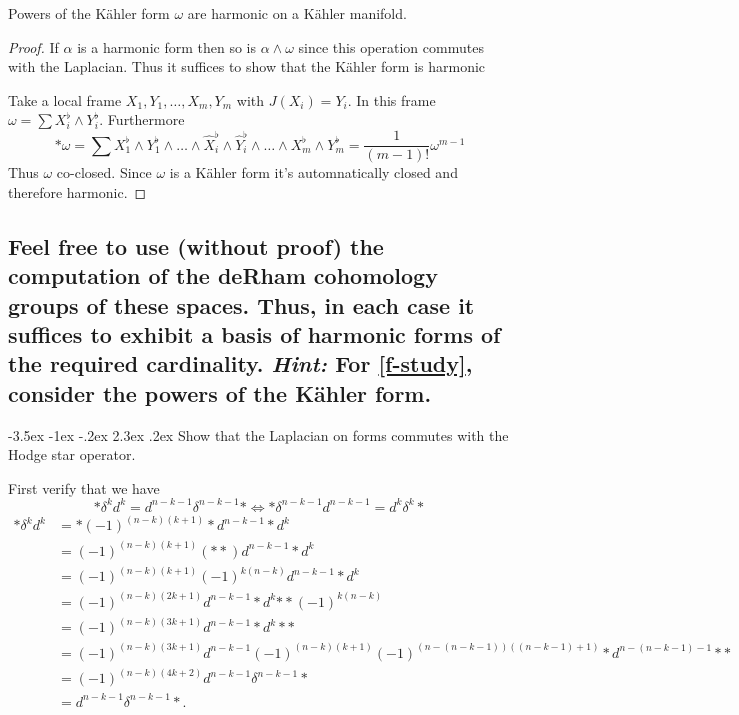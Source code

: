\documentclass[10pt]{article}
\makeatletter
\renewcommand\section{\@startsection{section}{1}{\z@}%
                                  {-3.5ex \@plus -1ex \@minus -.2ex}%
                                  {2.3ex \@plus.2ex}%
                                  {\normalfont\large\bfseries}}
\newcommand{\adjd}[1]{(-1)^{(n-#1)(#1+1)} * d^{n-#1-1} * }
\DeclareMathOperator{\2}{II}
\newcommand{\hint}[1]{{\emph{Hint:} #1}} %
\makeatother
\begin{document}
Powers of the K\"{a}hler form $\omega$ are harmonic on a K\"{a}hler manifold.
\begin{proof}
If $\alpha$ is a  harmonic form then so is $\alpha \wedge \omega$ since this operation commutes with the Laplacian. Thus it suffices to show that the K\"{a}hler form  is harmonic

Take a local frame $X_1, Y_1, \dots, X_m , Y_m$ with $J(X_i) = Y_i$. In this frame $\omega = \sum X_i^\flat \wedge Y_i^\flat$. Furthermore
\[*\omega = \sum X_1^\flat \wedge Y_1^\flat \wedge \dots \wedge \hat X_i^\flat\wedge \hat Y_i^\flat \wedge \dots \wedge X_m^\flat \wedge Y_m^\flat = \frac{1}{(m-1)!}\omega^{m-1}\]
Thus $\omega$ co-closed. Since $\omega$ is a K\"{a}hler form it's automnatically closed and therefore harmonic.
\end{proof}



\subsection*{Feel free to use (without proof) the computation of the deRham cohomology groups of these spaces. Thus, in each case it suffices to exhibit a basis of harmonic forms of the required cardinality.  \hint{For \ref{f-study}, consider the powers of the K\"ahler form.}}

\section{Show that the Laplacian on forms commutes with the Hodge star operator.}
\label{commute}

First verify that we have  
\[* \delta^k d^k = d^{n-k-1} \delta^{n-k-1} * \iff * \delta^{n-k-1} d^{n-k-1} = d^{k} \delta^{k} * \]
\begin{align*}
    * \delta^k d^k & = * \adjd{k} d^k \\
    &=  (-1)^{(n-k)(k+1)} (* *) d^{n-k-1} * d^k\\
    &=  (-1)^{(n-k)(k+1)} (-1)^{k(n-k)} d^{n-k-1} * d^k\\
    &=  (-1)^{(n-k)(2k+1)}   d^{n-k-1} * d^k {** (-1)^{k(n-k)}}\\
    &=  (-1)^{(n-k)(3k+1)}   d^{n-k-1} * d^k * *  \\
    &=  (-1)^{(n-k)(3k+1)}   d^{n-k-1} (-1)^{(n-k)(k+1)}\adjd{(n-k-1)} *  \\
    &=  (-1)^{(n-k)(4k+2)}   d^{n-k-1} \delta^{n-k-1} *  \\
    &=  d^{n-k-1} \delta^{n-k-1} *. \\
\end{align*}
\end{document}
